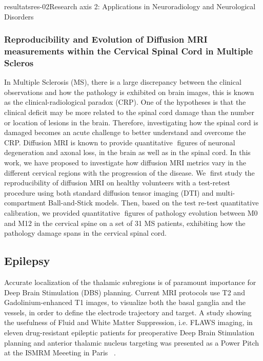 \documentclass{ra2018}
\begin{document}
\begin{module}{resultats}{res-02}{Research axis 2: Applications in Neuroradiology and Neurological Disorders}
\subsubsection{Reproducibility and Evolution of Diffusion MRI measurements within the Cervical Spinal Cord in Multiple Scleros}
\begin{participants}
\end{participants}
In Multiple Sclerosis (MS), there is a large discrepancy between the clinical observations and how the pathology is exhibited on brain images, this is known as the clinical-radiological paradox (CRP). One of the hypotheses is that the clinical deficit may be more related to the spinal cord damage than the number or location of lesions in the brain. Therefore, investigating how the spinal cord is damaged becomes an acute challenge to better understand and overcome the CRP. Diffusion MRI is known to provide quantitative figures of neuronal degeneration and axonal loss, in the brain as well as in the spinal cord. In this work, we have proposed to investigate how diffusion MRI metrics vary in the different cervical regions with the progression of the disease. We first study the reproducibility of diffusion MRI on healthy volunteers with a test-retest procedure using both standard diffusion tensor imaging (DTI)
and multi-compartment Ball-and-Stick models. Then, based on the test re-test quantitative calibration, we provided quantitative figures of pathology evolution between M0 and M12 in the cervical spine on a set of 31 MS patients, exhibiting how the pathology damage spans in the cervical spinal cord.

\subsection{Epilepsy}
\begin{participants}
\end{participants}

Accurate localization of the thalamic subregions is of paramount importance for Deep Brain Stimulation (DBS) planning. Current MRI protocols use T2 and Gadolinium-enhanced T1 images, to visualize both the basal ganglia and the vessels, in order to define the electrode trajectory and target. A study showing the usefulness of Fluid and White Matter Suppression, i.e. FLAWS imaging, in eleven drug-resistant epileptic patients for preoperative Deep Brain Stimulation planning and anterior thalamic nucleus targeting was presented as a Power Pitch at the ISMRM Meeeting in Paris ~\cite{bannier:inserm-01939451}.


\end{module}
\end{document}
